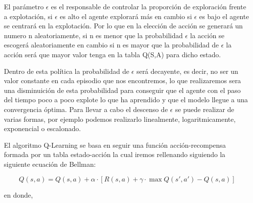 \begin{itemize}
 El parámetro $\epsilon$ es el responsable de controlar la proporción de exploración frente a explotación, si $\epsilon$  es alto el agente explorará más en cambio si $\epsilon$ es bajo
 el agente se centrará en la explotación. Por lo que en la elección de acción se generará un numero n aleatoriamente, si n es menor que la probabilidad $\epsilon$ la acción se escogerá aleatoriamente
 en cambio si n es mayor que la probabilidad de $\epsilon$ la acción será que mayor valor tenga en la tabla Q(S,A) para dicho estado. \newline
 
 Dentro de esta política la probabilidad de $\epsilon$ será decayente, es decir, no ser un valor constante en cada episodio que nos encontremos, lo que realizaremos sera una disminuición 
 de esta probabilidad para conseguir que el agente con el paso del tiempo poco a poco explote lo que ha aprendido y que el modelo llegue a una convergencia óptima. Para llevar a cabo el descenso
 de $\epsilon$ se puede realizar de varias formas, por ejemplo podemos realizarlo linealmente, logaritmicamente, exponencial o escalonado. \newline
  \end{itemize}

  El algoritmo Q-Learning  se basa en seguir una función acción-recompensa formada por un tabla estado-acción la cual iremos rellenando siguiendo la siguiente ecuación
  de Bellman\cite{Bellman}:
  
  \begin{equation} 
    Q(s, a) = Q(s, a) + \alpha \cdot [R(s, a) + \gamma \cdot \max Q(s', a') - Q(s, a)]
  \end{equation} 

  en donde, 


